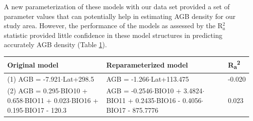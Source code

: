 \documentclass[review, authoryear]{elsarticle}   	%
\DeclareRobustCommand{\Jhoa}{\todo[author=Jhoa, inline, color=yellow!40, size=\small]}
\begin{document}
A  new parameterization of these models with our data set provided a set of parameter values that can potentially help in estimating AGB density for our study area. However, the performance of the models as assessed by the R$_a^2$ statistic provided little confidence in these model structures in predicting accurately AGB density (Table \ref{tab:globalModels}).

\begin{table}[htbp]
   \centering
  
   \begin{tabular}{p{6.5cm}p{6.5cm}p{1.5cm}}  %
      \toprule
       Original model   & Reparameterized model & R\textsubscript{a}\textsuperscript{2}\\
      \midrule
       (1) AGB = -7.921$\cdot$Lat+298.5 & AGB = -1.266$\cdot$Lat+113.475   & -0.020\\
       (2) AGB = 0.295$\cdot$BIO10 + 0.658$\cdot$BIO11 + 0.023$\cdot$BIO16 + 0.195$\cdot$BIO17 - 120.3 & AGB = -0.2546$\cdot$BIO10 + 3.4824$\cdot$BIO11 + 0.2435$\cdot$BIO16 - 0.4056$\cdot$BIO17 - 875.7776 & 0.023\\ 
        \bottomrule
   \end{tabular}
   \label{tab:globalModels}
\end{table}


\end{document}
